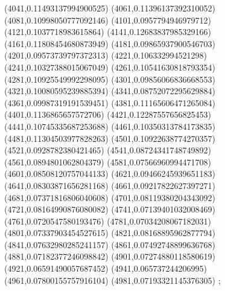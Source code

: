 {(4041,0.11493137994900525)
(4061,0.11396137392310052)
(4081,0.10998050777092146)
(4101,0.0957794946979712)
(4121,0.1037718983615864)
(4141,0.12683837985329166)
(4161,0.11808454680873949)
(4181,0.09865937900546703)
(4201,0.09573739797372313)
(4221,0.106332994521298)
(4241,0.10327388015067049)
(4261,0.10541630818793354)
(4281,0.10925549992298095)
(4301,0.09856066836668553)
(4321,0.10080595239885394)
(4341,0.08752072295629884)
(4361,0.09987319191539451)
(4381,0.11165606471265084)
(4401,0.1136865657572706)
(4421,0.12287557656825453)
(4441,0.10745335687253688)
(4461,0.10350313784173835)
(4481,0.11304503977828263)
(4501,0.10922638774270357)
(4521,0.0928782380421465)
(4541,0.08724341748749892)
(4561,0.0894801062804379)
(4581,0.07566960994471708)
(4601,0.08508120757044133)
(4621,0.09466245939651183)
(4641,0.08303871656281168)
(4661,0.09217822627397271)
(4681,0.07371816806040608)
(4701,0.08119380204343092)
(4721,0.08164990876080082)
(4741,0.07139401032008469)
(4761,0.0720547580193476)
(4781,0.07034208067182031)
(4801,0.07337903454527615)
(4821,0.08168895962877794)
(4841,0.07632980285241157)
(4861,0.07492748899636768)
(4881,0.07182377246098842)
(4901,0.07274880118580619)
(4921,0.06591490057687452)
(4941,0.065737244206995)
(4961,0.07800155757916104)
(4981,0.07193321145376305)
};
